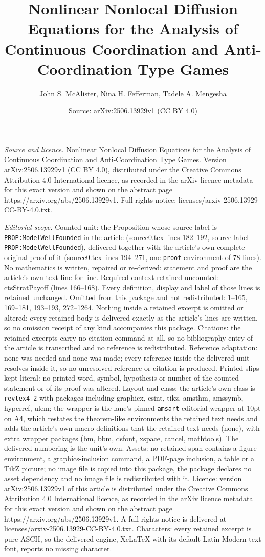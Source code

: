 \documentclass[10pt,a4paper]{amsart}
\title[Nonlinear Nonlocal Diffusion Equations for the Analysis of C]{Nonlinear Nonlocal Diffusion Equations for the Analysis of Continuous Coordination and Anti-Coordination Type Games}
\author{John S. McAlister, Nina H. Fefferman, Tadele A. Mengesha}
\date{Source: arXiv:2506.13929v1 (CC BY 4.0)}
\begin{document}
\maketitle

\noindent\emph{Source and licence.} Nonlinear Nonlocal Diffusion Equations for the Analysis of Continuous Coordination and Anti-Coordination Type Games. Version arXiv:2506.13929v1 (CC BY 4.0), distributed under the Creative Commons Attribution 4.0 International licence, as recorded in the arXiv licence metadata for this exact version and shown on the abstract page https://arxiv.org/abs/2506.13929v1. Full rights notice: licenses/arxiv-2506.13929-CC-BY-4.0.txt.\par\smallskip

\noindent\textit{Editorial scope.} Counted unit: the Proposition whose source label is \texttt{PROP:ModelWellFounded} in the article (source0.tex lines 182--192, source label \texttt{PROP:ModelWellFounded}), delivered together with the article's own complete original proof of it (source0.tex lines 194--271, one \texttt{proof} environment of 78 lines). No mathematics is written, repaired or re-derived: statement and proof are the article's own text line for line. Required context retained uncounted: ctsStratPayoff (lines 166--168). Every definition, display and label of those lines is retained unchanged. Omitted from this package and not redistributed: 1--165, 169--181, 193--193, 272--1264. Nothing inside a retained excerpt is omitted or altered: every retained body is delivered exactly as the article's lines are written, so no omission receipt of any kind accompanies this package. Citations: the retained excerpts carry no citation command at all, so no bibliography entry of the article is transcribed and no reference is redistributed. Reference adaptation: none was needed and none was made; every reference inside the delivered unit resolves inside it, so no unresolved reference or citation is produced. Printed slips kept literal: no printed word, symbol, hypothesis or number of the counted statement or of its proof was altered. Layout and class: the article's own class is \texttt{revtex4-2} with packages including graphicx, esint, tikz, amsthm, amssymb, hyperref, ulem; the wrapper is the lane's pinned \texttt{amsart} editorial wrapper at 10pt on A4, which restates the theorem-like environments the retained text needs and adds the article's own macro definitions that the retained text needs (none), with extra wrapper packages (bm, bbm, dsfont, xspace, cancel, mathtools). The delivered numbering is the unit's own. Assets: no retained span contains a figure environment, a graphics-inclusion command, a PDF-page inclusion, a table or a TikZ picture; no image file is copied into this package, the package declares no asset dependency and no image file is redistributed with it. Licence: version arXiv:2506.13929v1 of this article is distributed under the Creative Commons Attribution 4.0 International licence, as recorded in the arXiv licence metadata for this exact version and shown on the abstract page https://arxiv.org/abs/2506.13929v1. A full rights notice is delivered at licenses/arxiv-2506.13929-CC-BY-4.0.txt. Characters: every retained excerpt is pure ASCII, so the delivered engine, XeLaTeX with its default Latin Modern text font, reports no missing character.
\end{document}
